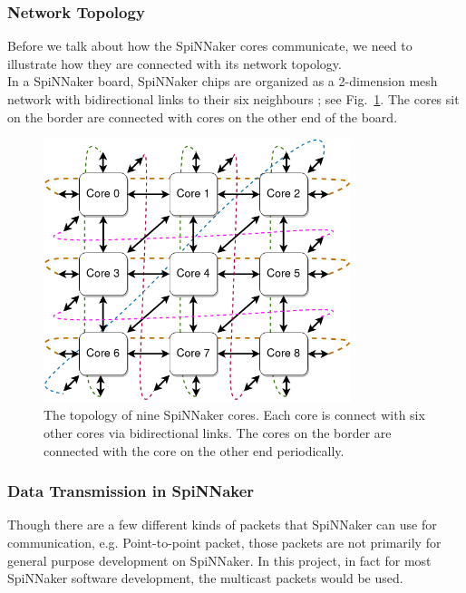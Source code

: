 \subsubsection{Network Topology}
Before we talk about how the SpiNNaker cores communicate, we need to illustrate how they are connected with its network topology.\\

In a SpiNNaker board, SpiNNaker chips are organized as a 2-dimension mesh network with bidirectional links to their six neighbours \cite{testchip}; see Fig.~\ref{fig:topology}. The cores sit on the border are connected with cores on the other end of the board.

\begin{figure}[!tb]
   \centering
       \includegraphics[width=0.8\textwidth]{figures/topology.png}
       \caption{The topology of nine SpiNNaker cores. Each core is connect with six other cores via bidirectional links. The cores on the border are connected with the core on the other end periodically.}
       \label{fig:topology}
\end{figure}

\subsubsection{Data Transmission in SpiNNaker} \label{sec:dt}
Though there are a few different kinds of packets that SpiNNaker can use for communication, e.g. Point-to-point packet, those packets are not primarily for general purpose development on SpiNNaker. In this project, in fact for most SpiNNaker software development, the multicast packets would be used.\\

